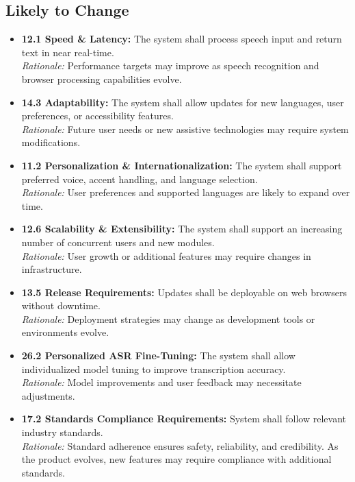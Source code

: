 \documentclass[12pt]{article}
\begin{document}
\subsection{Likely to Change}
\begin{itemize}
    \item \textbf{12.1 Speed \& Latency:} The system shall process speech input and return text in near real-time.\\
    \textit{Rationale:} Performance targets may improve as speech recognition and browser processing capabilities evolve.

    \item \textbf{14.3 Adaptability:} The system shall allow updates for new languages, user preferences, or accessibility features.\\
    \textit{Rationale:} Future user needs or new assistive technologies may require system modifications.

    \item \textbf{11.2 Personalization \& Internationalization:} The system shall support preferred voice, accent handling, and language selection.\\
    \textit{Rationale:} User preferences and supported languages are likely to expand over time.

    \item \textbf{12.6 Scalability \& Extensibility:} The system shall support an increasing number of concurrent users and new modules.\\
    \textit{Rationale:} User growth or additional features may require changes in infrastructure.

    \item \textbf{13.5 Release Requirements:} Updates shall be deployable on web browsers without downtime.\\
    \textit{Rationale:} Deployment strategies may change as development tools or environments evolve.

    \item \textbf{26.2 Personalized ASR Fine-Tuning:} The system shall allow individualized model tuning to improve transcription accuracy.\\
    \textit{Rationale:} Model improvements and user feedback may necessitate adjustments.


    \item \textbf{17.2 Standards Compliance Requirements:} System shall follow relevant industry standards.\\
    \textit{Rationale:} Standard adherence ensures safety, reliability, and credibility. As the product evolves, new features may require compliance with additional standards.
\end{itemize}
\end{document}
